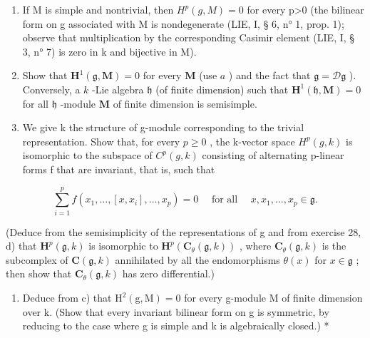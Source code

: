 \begin{enumerate}
\def\labelenumi{\alph{enumi})}
\item
  If M is simple and nontrivial, then \(H^{p}(g, M)=0\) for every p\textgreater0 (the bilinear form on g associated with M is nondegenerate (LIE, I, § 6, n° 1, prop. 1); observe that multiplication by the corresponding Casimir element (LIE, I, § 3, n° 7) is zero in k and bijective in M).
\item
  Show that \(\mathbf{H}^{1}(\mathfrak{g},\mathbf{M}) = 0\) for every \(\mathbf{M}\) (use \(a\) ) and the fact that \(\mathfrak{g} = \mathcal{D}\mathfrak{g}\) ). Conversely, a \(k\) -Lie algebra \(\mathfrak{h}\) (of finite dimension) such that \(\mathbf{H}^{1}(\mathfrak{h},\mathbf{M}) = 0\) for all \(\mathfrak{h}\) -module \(\mathbf{M}\) of finite dimension is semisimple.
\item
  We give k the structure of g-module corresponding to the trivial representation. Show that, for every \(p \geqslant 0\) , the k-vector space \(H^{p}(g, k)\) is isomorphic to the subspace of \(C^{p}(g, k)\) consisting of alternating p-linear forms f that are invariant, that is, such that
\end{enumerate}

\[
\sum_ {i = 1} ^ {p} f (x _ {1}, \dots , [ x, x _ {i} ], \dots , x _ {p}) = 0 \quad \text { for   all } \quad x, x _ {1}, \dots , x _ {p} \in \mathfrak {g}.
\]

(Deduce from the semisimplicity of the representations of g and from exercise 28, d) that \(\mathbf{H}^p(\mathfrak{g}, k)\) is isomorphic to \(\mathbf{H}^p(\mathbf{C}_{\theta}(\mathfrak{g}, k))\) , where \(\mathbf{C}_{\theta}(\mathfrak{g}, k)\) is the subcomplex of \(\mathbf{C}(\mathfrak{g}, k)\) annihilated by all the endomorphisms \(\theta(x)\) for \(x \in \mathfrak{g}\) ; then show that \(\mathbf{C}_{\theta}(\mathfrak{g}, k)\) has zero differential.)

\begin{enumerate}
\def\labelenumi{\alph{enumi})}
\setcounter{enumi}{3}
\tightlist
\item
  Deduce from c) that \(\mathrm{H}^{2}(\mathrm{g},\mathrm{M})=0\) for every g-module M of finite dimension over k. (Show that every invariant bilinear form on g is symmetric, by reducing to the case where g is simple and k is algebraically closed.) *
\end{enumerate}
